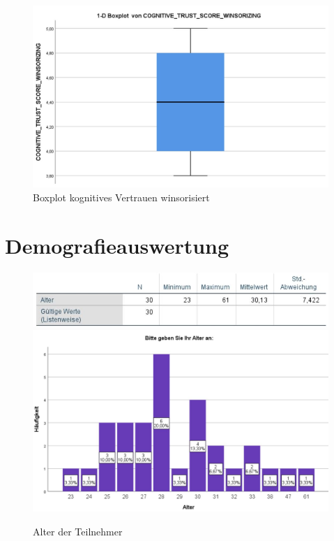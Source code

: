\documentclass[a4paper,11pt]{article}%
\renewcommand{\\}{\vspace*{0.5\baselineskip} \newline}
\begin{document}
	
\begin{figure}[H]
		\begin{footnotesize}
			\includegraphics[width=\textwidth]{Abbildungen/Post_QuestionnaireStatistiks/boxplot_cognitive_trust_winsorisiert}\\
			\caption{Boxplot kognitives Vertrauen winsorisiert}
			\label{fig:boxplot_cognitive_trust_winsorisiert}
		\end{footnotesize}
	\end{figure}	

\clearpage
\newpage
	\section{Demografieauswertung}
	\begin{figure}[H]
		\begin{footnotesize}
			\includegraphics[width=\textwidth]{Abbildungen/Pre_QuestionnaireStatistiks/teilnehmerStatistik}\\
			\includegraphics[width=\textwidth]{Abbildungen/Demographie/alter}\\
			\caption{Alter der Teilnehmer}
			\label{fig:Teilnehmer}
		\end{footnotesize}
	\end{figure}	
	
\end{document}
